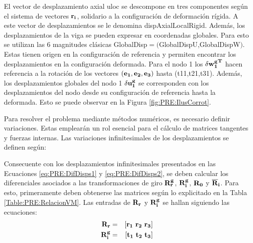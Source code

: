 El vector de desplazamiento axial \gls{uloc} se descompone en tres componentes según el sistema de vectores $\bf{r_i}$, solidario a la configuración de deformación rígida. A este vector de desplazamientos se le denomina \gls{dispAxialLocalRigid}. Además, los desplazamientos de la viga se pueden expresar en coordenadas globales.  Para esto se utilizan las 6 magnitudes clásicas \gls{GlobalDisp}$=($\gls{GlobalDispU},\gls{GlobalDispW}$)$. Estas tienen origen en la configuración de referencia y permiten encontrar los desplazamientos en la configuración deformada. Para el nodo 1 los $\bf{\delta{w_1^g}^T}$ hacen referencia a la rotación de los vectores $(\bf{e_1},\bf{e_2},\bf{e_3})$ hasta (\gls{t11},\gls{t21},\gls{t31}). Además, los desplazamientos globales del nodo 1 $\bf{\delta u_1^g}$ se corresponden con los desplazamientos del nodo desde su configuración de referencia hasta la deformada. Esto se puede observar en la Figura \ref{fig:PRE:IlusCorrot}.
%	

Para resolver el problema mediante métodos numéricos, es necesario definir variaciones. Estas emplearán un rol esencial para el cálculo de matrices tangentes y fuerzas internas. Las variaciones infinitesimales de los desplazamientos se definen según:


Consecuente con los desplazamientos infinitesimales presentados en las Ecuaciones \eqref{eq:PRE:DifDisps1} y \eqref{eq:PRE:DifDisps2}, se deben calcular los diferenciales asociados a las transformaciones de giro $\bf{R_r^g}$, $\bf{R_i^g}$, $\bf{R_0}$ y $\bf{\overline{R}}_i$.
Para esto, primeramente deben obtenerse las matrices según lo explicitado en la Tabla \ref{Table:PRE:RelacionVM}. Las entradas de $\bf{R}_r$ y  $\bf{R}_i^g$ se hallan siguiendo las ecuaciones:
\begin{eqnarray}
	\label{eq:PRE:Rr}
	\bf{R_r}&=&[\bf{r_1} ~ \bf{r_2} ~ \bf{r_3}]\\
	\label{eq:PRE:Rg}
	\bf{R}_i^g&=&[\bf{t_1} ~ \bf{t_2} ~ \bf{t_3}]
\end{eqnarray}

